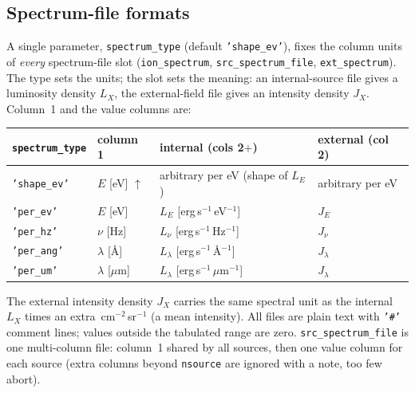 \documentclass[english,a4paper]{my_memo}
\newcommand{\code}[1]{\texttt{#1}}
\begin{document}
\subsection{Spectrum-file formats}
\label{sec:specfmt}
A single parameter, \code{spectrum\_type} (default \code{'shape\_ev'}), fixes
the column units of \emph{every} spectrum-file slot
(\code{ion\_spectrum}, \code{src\_spectrum\_file}, \code{ext\_spectrum}).
The type sets the units; the slot sets the meaning: an internal-source
file gives a luminosity density $L_X$, the external-field file gives an
intensity density $J_X$.  Column~1 and the value columns are:
\begin{center}\small
\begin{tabular}{llll}
\toprule
\code{spectrum\_type} & column 1 & internal (cols 2$+$) & external (col 2) \\
\midrule
\code{'shape\_ev'}   & $E$ [eV] $\uparrow$ & arbitrary per eV (shape of $L_E$) & arbitrary per eV \\
\code{'per\_ev'} & $E$ [eV]            & $L_E$ [erg\,s$^{-1}$\,eV$^{-1}$]      & $J_E$ \\
\code{'per\_hz'} & $\nu$ [Hz]          & $L_\nu$ [erg\,s$^{-1}$\,Hz$^{-1}$]    & $J_\nu$ \\
\code{'per\_ang'}& $\lambda$ [\AA]     & $L_\lambda$ [erg\,s$^{-1}$\,\AA$^{-1}$] & $J_\lambda$ \\
\code{'per\_um'} & $\lambda$ [$\mu$m]  & $L_\lambda$ [erg\,s$^{-1}$\,$\mu$m$^{-1}$] & $J_\lambda$ \\
\bottomrule
\end{tabular}
\end{center}
\noindent The external intensity density $J_X$ carries the same spectral
unit as the internal $L_X$ times an extra \,cm$^{-2}$\,sr$^{-1}$ (a mean
intensity).  All files are plain text with \code{'\#'} comment lines;
values outside the tabulated range are zero.  \code{src\_spectrum\_file}
is one multi-column file: column~1 shared by all sources, then one value
column for each source (extra columns beyond \code{nsource} are ignored
with a note, too few abort).
\end{document}
